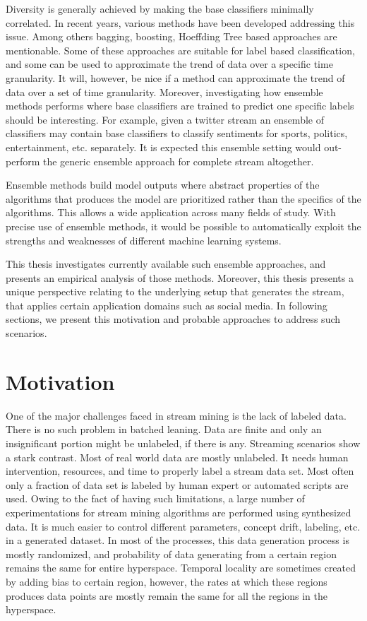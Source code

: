 \documentclass[a4paper, 11pt, oneside]{book}
\begin{document}
Diversity is generally achieved by making the base classifiers minimally correlated. In recent years, various methods have been developed addressing this issue. Among others bagging, boosting, Hoeffding Tree based approaches are mentionable. Some of these approaches are suitable for label based classification, and some can be used to approximate the trend of data over a specific time granularity. It will, however, be nice if a method can approximate the trend of data over a set of time granularity. Moreover, investigating how ensemble methods performs where base classifiers are trained to predict one specific labels should be interesting. For example, given a twitter stream an ensemble of classifiers may contain base classifiers to classify sentiments for sports, politics, entertainment, etc. separately. It is expected this ensemble setting would out-perform the generic ensemble approach for complete stream altogether.

Ensemble methods build model outputs where abstract properties of the algorithms that produces the model are prioritized rather than the specifics of the algorithms. This allows a wide application across many fields of study. With precise use of ensemble methods, it would be possible to automatically exploit the strengths and weaknesses of different machine learning systems.

This thesis investigates currently available such ensemble approaches, and presents an empirical analysis of those methods. Moreover, this thesis presents a unique perspective relating to the underlying setup that generates the stream, that applies certain application domains such as social media. In following sections, we present this motivation and probable approaches to address such scenarios.

\section{Motivation}
One of the major challenges faced in stream mining is the lack of labeled data. There is no such problem in batched leaning. Data are finite and only an insignificant portion might be unlabeled, if there is any. Streaming scenarios show a stark contrast. Most of real world data are mostly unlabeled. It needs human intervention, resources, and time to properly label a stream data set. Most often only a fraction of data set is labeled by human expert or automated scripts are used. Owing to the fact of having such limitations, a large number of experimentations for stream mining algorithms are performed using synthesized data. It is much easier to control different parameters, concept drift, labeling, etc. in a generated dataset. In most of the processes, this data generation process is mostly randomized, and probability of data generating from a certain region remains the same for entire hyperspace. Temporal locality are sometimes created by adding bias to certain region, however, the rates at which these regions produces data points are mostly remain the same for all the regions in the hyperspace.
\end{document}
